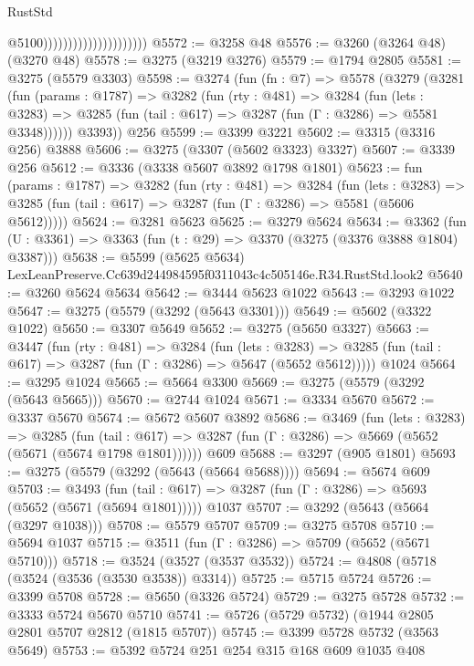 \begin{lexlean}{RustStd}
\begin{coremodule}
                                              @5100)))))))))))))))))))))
@5572 := @3258 @48
@5576 := @3260 (@3264 @48) (@3270 @48)
@5578 := @3275 (@3219 @3276)
@5579 := @1794 @2805
@5581 := @3275 (@5579 @3303)
@5598 := @3274
    (fun (fn : @7) =>
    @5578
      (@3279
        (@3281
          (fun (params : @1787) =>
          @3282
            (fun (rty : @481) =>
            @3284
              (fun (lets : @3283) =>
              @3285 (fun (tail : @617) => @3287 (fun (Γ : @3286) => @5581 @3348))))))
        @3393))
    @256
@5599 := @3399 @3221
@5602 := @3315 (@3316 @256) @3888
@5606 := @3275 (@3307 (@5602 @3323) @3327)
@5607 := @3339 @256
@5612 := @3336 (@3338 @5607 @3892 @1798 @1801)
@5623 := fun (params : @1787) =>
  @3282
    (fun (rty : @481) =>
    @3284
      (fun (lets : @3283) =>
      @3285 (fun (tail : @617) => @3287 (fun (Γ : @3286) => @5581 (@5606 @5612)))))
@5624 := @3281 @5623
@5625 := @3279 @5624
@5634 := @3362 (fun (U : @3361) => @3363 (fun (t : @29) => @3370 (@3275 (@3376 @3888 @1804) @3387)))
@5638 := @5599 (@5625 @5634) LexLeanPreserve.Cc639d244984595f0311043c4c505146e.R34.RustStd.look2
@5640 := @3260 @5624 @5634
@5642 := @3444 @5623 @1022
@5643 := @3293 @1022
@5647 := @3275 (@5579 (@3292 (@5643 @3301)))
@5649 := @5602 (@3322 @1022)
@5650 := @3307 @5649
@5652 := @3275 (@5650 @3327)
@5663 := @3447
    (fun (rty : @481) =>
    @3284
      (fun (lets : @3283) =>
      @3285 (fun (tail : @617) => @3287 (fun (Γ : @3286) => @5647 (@5652 @5612)))))
    @1024
@5664 := @3295 @1024
@5665 := @5664 @3300
@5669 := @3275 (@5579 (@3292 (@5643 @5665)))
@5670 := @2744 @1024
@5671 := @3334 @5670
@5672 := @3337 @5670
@5674 := @5672 @5607 @3892
@5686 := @3469
    (fun (lets : @3283) =>
    @3285
      (fun (tail : @617) => @3287 (fun (Γ : @3286) => @5669 (@5652 (@5671 (@5674 @1798 @1801))))))
    @609
@5688 := @3297 (@905 @1801)
@5693 := @3275 (@5579 (@3292 (@5643 (@5664 @5688))))
@5694 := @5674 @609
@5703 := @3493
    (fun (tail : @617) => @3287 (fun (Γ : @3286) => @5693 (@5652 (@5671 (@5694 @1801)))))
    @1037
@5707 := @3292 (@5643 (@5664 (@3297 @1038)))
@5708 := @5579 @5707
@5709 := @3275 @5708
@5710 := @5694 @1037
@5715 := @3511 (fun (Γ : @3286) => @5709 (@5652 (@5671 @5710)))
@5718 := @3524 (@3527 (@3537 @3532))
@5724 := @4808 (@5718 (@3524 (@3536 (@3530 @3538)) @3314))
@5725 := @5715 @5724
@5726 := @3399 @5708
@5728 := @5650 (@3326 @5724)
@5729 := @3275 @5728
@5732 := @3333 @5724 @5670 @5710
@5741 := @5726 (@5729 @5732) (@1944 @2805 @2801 @5707 @2812 (@1815 @5707))
@5745 := @3399 @5728 @5732 (@3563 @5649)
@5753 := @5392 @5724 @251 @254 @315 @168 @609 @1035 @408

\end{coremodule}
\end{lexlean}
